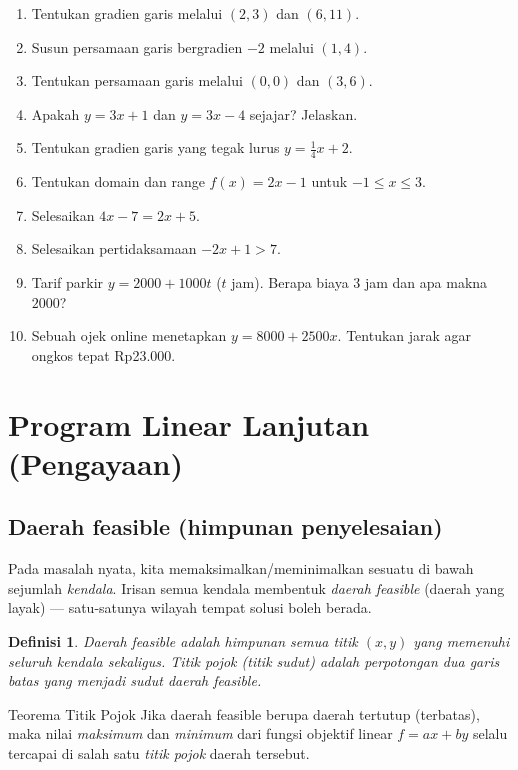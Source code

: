 \documentclass[11pt,a4paper]{report}
\theoremstyle{gaya}
\newtheorem{definisi}{Definisi}[chapter]
\begin{document}
\begin{latihan}
\begin{enumerate}[leftmargin=*]
  \item Tentukan gradien garis melalui $(2,3)$ dan $(6,11)$.
  \item Susun persamaan garis bergradien $-2$ melalui $(1,4)$.
  \item Tentukan persamaan garis melalui $(0,0)$ dan $(3,6)$.
  \item Apakah $y=3x+1$ dan $y=3x-4$ sejajar? Jelaskan.
  \item Tentukan gradien garis yang tegak lurus $y=\tfrac14 x+2$.
  \item Tentukan domain dan range $f(x)=2x-1$ untuk $-1\le x\le3$.
  \item Selesaikan $4x-7=2x+5$.
  \item Selesaikan pertidaksamaan $-2x+1>7$.
  \item Tarif parkir $y=2000+1000t$ ($t$ jam). Berapa biaya $3$ jam dan apa makna $2000$?
  \item Sebuah ojek online menetapkan $y=8000+2500x$. Tentukan jarak agar ongkos tepat Rp23.000.
\end{enumerate}
\end{latihan}

\section{Program Linear Lanjutan (Pengayaan)}

\subsection*{Daerah feasible (himpunan penyelesaian)}
Pada masalah nyata, kita memaksimalkan/meminimalkan sesuatu di bawah sejumlah \emph{kendala}. Irisan semua kendala membentuk \emph{daerah feasible} (daerah yang layak) --- satu-satunya wilayah tempat solusi boleh berada.

\begin{definisi}
\emph{Daerah feasible} adalah himpunan semua titik $(x,y)$ yang memenuhi seluruh kendala sekaligus. \emph{Titik pojok} (titik sudut) adalah perpotongan dua garis batas yang menjadi sudut daerah feasible.
\end{definisi}

\begin{konsep}{Teorema Titik Pojok}
Jika daerah feasible berupa daerah tertutup (terbatas), maka nilai \emph{maksimum} dan \emph{minimum} dari fungsi objektif linear $f=ax+by$ selalu tercapai di salah satu \emph{titik pojok} daerah tersebut.
\end{konsep}
\end{document}
